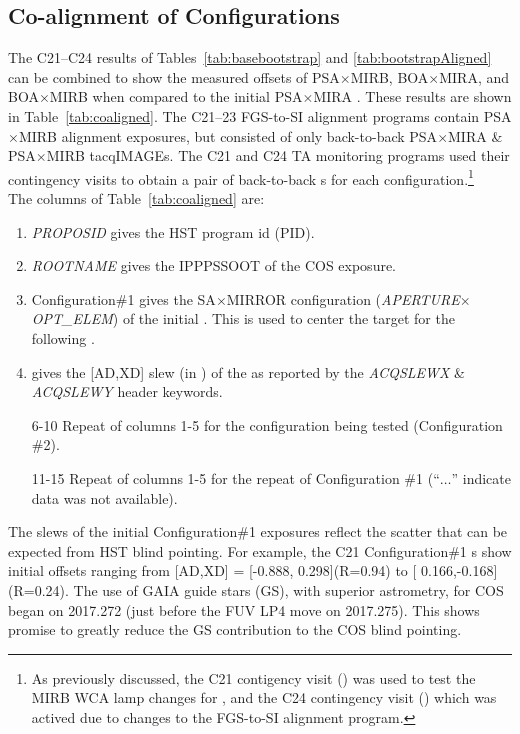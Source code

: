 

\subsection{Co-alignment of  Configurations \label{subsec:NIMsummary}}
The C21--C24 results of Tables~\ref{tab:basebootstrap} and \ref{tab:bootstrapAligned} can be combined to show the measured offsets of PSA$\times$MIRB, BOA$\times$MIRA, and BOA$\times$MIRB when compared to the initial PSA$\times$MIRA .
These results are shown in Table~\ref{tab:coaligned}. The C21--23 FGS-to-SI alignment programs contain PSA$\times$MIRB alignment exposures, but consisted of only back-to-back PSA$\times$MIRA \& PSA$\times$MIRB tacq{IMAGE}s.
The C21 and C24 TA monitoring programs used their contingency visits to obtain a pair of back-to-back s for each configuration.\footnote{As previously discussed, the C21 contigency visit () was used to test the MIRB WCA lamp changes for ,
and the C24 contingency visit () which was actived due to changes to the FGS-to-SI alignment program.}\\

The columns of Table~\ref{tab:coaligned} are:
\footnotesize
\begin{enumerate}
\item \textit{PROPOSID} gives the HST program id (PID).
\item \textit{ROOTNAME} gives the IPPPSSOOT of the COS exposure.
\item Configuration\#1 gives the SA$\times$MIRROR configuration (\textit{APERTURE}$\times$\textit{OPT\_ELEM}) of the initial .
This  is used to center the target for the following .
\item gives the [AD,XD] slew (in \arcsec)  of the  as reported by the \textit{ACQSLEWX} \& \textit{ACQSLEWY} header keywords.
\item[6-10] Repeat of columns 1-5 for the configuration being tested (Configuration \#2).
\item[11-15] Repeat of columns 1-5 for the repeat of Configuration \#1 (``$\dots$'' indicate data was not available).
\end{enumerate}
\normalsize

The  slews of the initial Configuration\#1 exposures reflect the scatter that can be expected from HST blind pointing.
For example, the C21 Configuration\#1 s show initial offsets ranging from [AD,XD] = [-0.888, 0.298]\arcsec (R=0.94\arcsec)
to [ 0.166,-0.168]\arcsec (R=0.24\arcsec). The use of GAIA guide stars (GS), with superior astrometry, for COS began on 2017.272 (just before
the FUV LP4 move on 2017.275). This shows promise to greatly reduce the GS contribution to the COS blind pointing.

